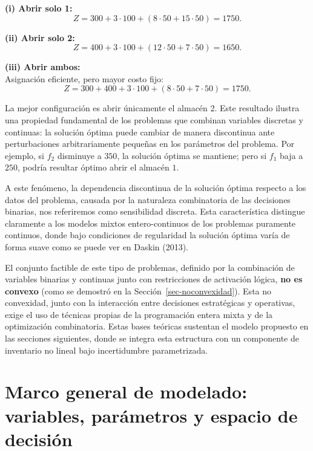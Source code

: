 \documentclass[
  spanish,
  us-letterpaper,
]{scrreprt}
\numberwithin{equation}{section}
\begin{document}
\textbf{(i) Abrir solo 1:}\\
\[
Z = 300 + 3\cdot 100 + (8\cdot 50 + 15\cdot 50)=1750.
\]

\textbf{(ii) Abrir solo 2:}\\
\[
Z = 400 + 3\cdot 100 + (12\cdot 50 + 7\cdot 50)=1650.
\]

\textbf{(iii) Abrir ambos:}\\
Asignación eficiente, pero mayor costo fijo:\\
\[
Z = 300 + 400 + 3\cdot 100 + (8\cdot 50 + 7\cdot 50)=1750.
\]

La mejor configuración es abrir únicamente el almacén 2. Este resultado
ilustra una propiedad fundamental de los problemas que combinan
variables discretas y continuas: la solución óptima puede cambiar de
manera discontinua ante perturbaciones arbitrariamente pequeñas en los
parámetros del problema. Por ejemplo, si \(f_2\) disminuye a \(350\), la
solución óptima se mantiene; pero si \(f_1\) baja a \(250\), podría
resultar óptimo abrir el almacén \(1\).

A este fenómeno, la dependencia discontinua de la solución óptima
respecto a los datos del problema, causada por la naturaleza
combinatoria de las decisiones binarias, nos referiremos como
sensibilidad discreta. Esta característica distingue claramente a los
modelos mixtos entero-continuos de los problemas puramente continuos,
donde bajo condiciones de regularidad la solución óptima varía de forma
suave como se puede ver en Daskin (2013).

El conjunto factible de este tipo de problemas, definido por la
combinación de variables binarias y continuas junto con restricciones de
activación lógica, \textbf{no es convexo} (como se demostró en la
Sección~\ref{sec-noconvexidad}). Esta no convexidad, junto con la
interacción entre decisiones estratégicas y operativas, exige el uso de
técnicas propias de la programación entera mixta y de la optimización
combinatoria. Estas bases teóricas sustentan el modelo propuesto en las
secciones siguientes, donde se integra esta estructura con un componente
de inventario no lineal bajo incertidumbre parametrizada.

\section{Marco general de modelado: variables, parámetros y espacio de
decisión}\label{marco-general-de-modelado-variables-paruxe1metros-y-espacio-de-decisiuxf3n}
\end{document}
